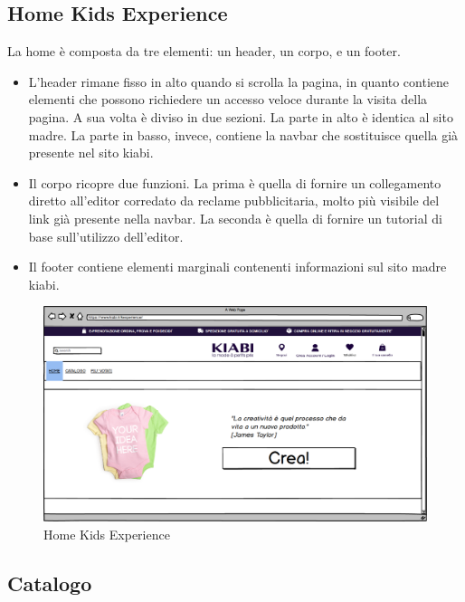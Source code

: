 \documentclass[12pt,italian,]{report}
\begin{document}
\newpage
\subsection{Home Kids Experience} 

La home è composta da tre elementi: un header, un corpo, e un footer.
\begin{itemize}
\item
L’header rimane fisso in alto quando si scrolla la pagina, in quanto contiene elementi che possono richiedere un accesso veloce durante la visita della pagina. 
A sua volta è diviso in due sezioni. La parte in alto è identica al sito madre. La parte in basso, invece, contiene la navbar che sostituisce quella già presente nel sito kiabi.

\item
Il corpo ricopre due funzioni. 
La prima è quella di fornire un collegamento diretto all'editor corredato da reclame pubblicitaria, molto più visibile del link già presente nella navbar. 
La seconda è quella di fornire un tutorial di base sull'utilizzo dell'editor.

\item Il footer contiene elementi marginali contenenti informazioni sul sito madre kiabi.
\end{itemize}

\begin{figure}[h]
\centering
\includegraphics{balsamiq/Home Sottosito Utente Esterno .png}
\caption{Home Kids Experience}
\label{kids_home}
\end{figure}




\subsection{Catalogo} 
\end{document}
